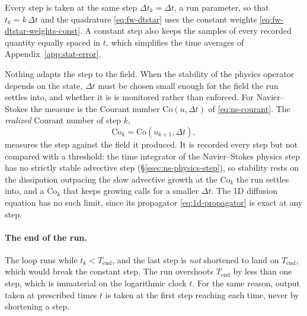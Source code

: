 \documentclass{article}
\begin{document}
Every step is taken at the same step $\Delta t_k = \Delta t$, a run
parameter, so that $t_k = k\, \Delta t$ and the quadrature
\eqref{eq:fw-dtstar} uses the constant weights
\eqref{eq:fw-dtstar-weights-const}. A constant step also keeps the samples of
every recorded quantity equally spaced in $t$, which simplifies the time
averages of Appendix~\ref{app:stat-error}.
\par
Nothing adapts the step to the field. When the stability of the physics
operator depends on the state, $\Delta t$ must be chosen small enough for
the field the run settles into, and whether it is is monitored rather than
enforced. For Navier--Stokes the measure is the Courant number
$\mathrm{Co}(u, \Delta t)$ of \eqref{eq:ns-courant}. The \emph{realized}
Courant number of step $k$,
\begin{equation}\label{eq:alg-realized-cfl}
  \mathrm{Co}_k = \mathrm{Co}(u_{k+1}, \Delta t),
\end{equation}
measures the step against the field it produced. It is recorded every step
but not compared with a threshold: the time integrator of the Navier--Stokes
physics step has no strictly stable advective step
(\S\ref{ssec:ns-physics-step}), so stability rests on the dissipation
outpacing the slow advective growth at the $\mathrm{Co}_k$ the run settles
into, and a $\mathrm{Co}_k$ that keeps growing calls for a smaller
$\Delta t$. The 1D diffusion
equation has no such limit, since its propagator \eqref{eq:1d-propagator} is
exact at any step.

\paragraph{The end of the run.} The loop runs while $t_k < T_{\mathrm{end}}$,
and the last step is \emph{not} shortened to land on $T_{\mathrm{end}}$, which
would break the constant step. The run overshoots $T_{\mathrm{end}}$ by less
than one step, which is immaterial on the logarithmic clock $t$. For the same
reason, output taken at prescribed times $t$ is taken at the first step
reaching each time, never by shortening a step.
\end{document}
